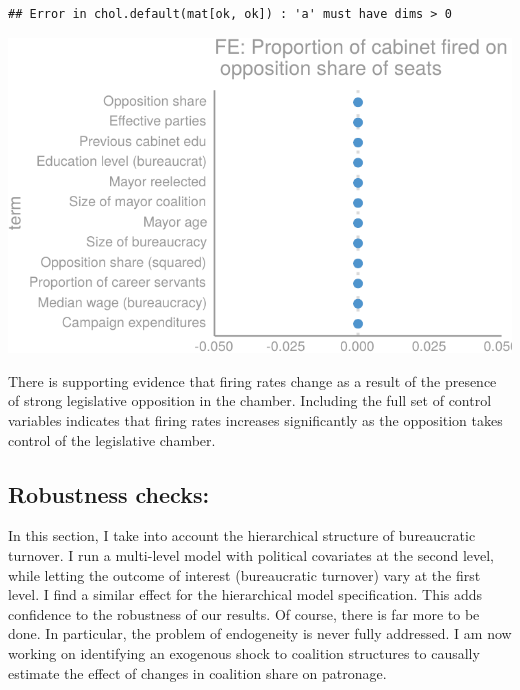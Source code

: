 \documentclass[12pt,]{article}
\begin{document}
\begin{verbatim}
## Error in chol.default(mat[ok, ok]) : 'a' must have dims > 0
\end{verbatim}

\begin{center}\includegraphics{dissertation_files/figure-latex/firing-2} \end{center}

There is supporting evidence that firing rates change as a result of the
presence of strong legislative opposition in the chamber. Including the
full set of control variables indicates that firing rates increases
significantly as the opposition takes control of the legislative
chamber.

\hypertarget{robustness-checks}{%
\subsection{Robustness checks:}\label{robustness-checks}}

In this section, I take into account the hierarchical structure of
bureaucratic turnover. I run a multi-level model with political
covariates at the second level, while letting the outcome of interest
(bureaucratic turnover) vary at the first level. I find a similar effect
for the hierarchical model specification. This adds confidence to the
robustness of our results. Of course, there is far more to be done. In
particular, the problem of endogeneity is never fully addressed. I am
now working on identifying an exogenous shock to coalition structures to
causally estimate the effect of changes in coalition share on patronage.
\end{document}
